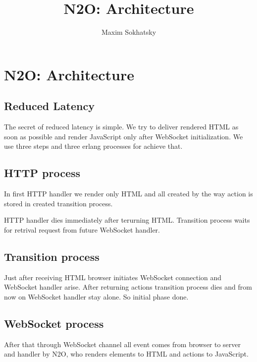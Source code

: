 \documentclass[11pt]{article}
\begin{document}
\title{N2O: Architecture}
\author{Maxim Sokhatsky}

\paragraph{}
\section*{N2O: Architecture}

\subsection*{Reduced Latency}
The secret of reduced latency is simple. We try to deliver rendered HTML
as soon as possible and render JavaScript only after WebSocket initialization.
We use three steps and three erlang processes for achieve that.


\subsection*{HTTP process}
In first HTTP handler we render only HTML and all created by
the way action is stored in created transition process.


HTTP handler dies immediately after terurning HTML. Transition
process waits for retrival request from future WebSocket handler.

\subsection*{Transition process}
Just after receiving HTML browser initiates WebSocket connection
and WebSocket handler arise. After returning actions transition
process dies and from now on WebSocket handler stay alone.
So initial phase done.

\subsection*{WebSocket process}
After that through WebSocket channel all event comes from
browser to server and handler by N2O, who renders elements
to HTML and actions to JavaScript.







\end{document}
